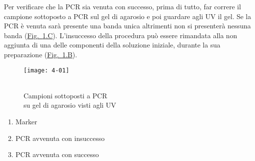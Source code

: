
Per verificare che la PCR sia venuta con successo, prima di tutto, far correre il campione sottoposto a PCR sul gel di agarosio e poi guardare agli UV il gel. Se la PCR è venuta sarà presente una banda unica altrimenti non si presenterà nessuna banda (\hyperref[img:4-01]{Fig.~\ref{img:4-01}.C}). L'insuccesso della procedura può essere rimandata alla non aggiunta di una delle componenti della soluzione iniziale, durante la sua preparazione (\hyperref[img:4-01]{Fig.~\ref{img:4-01}.B}).

\begin{minipage}{0.7\textwidth}
	\begin{figure}[H]
		\captionsetup{singlelinecheck=off}
		\centering
		\begin{annotatedFigure}
			{
				\texttt{[image: 4-01]}
			}
		\end{annotatedFigure}
		\caption{\\Campioni sottoposti a PCR\\ su gel di agarosio visti agli UV}\label{img:4-01}
	\end{figure}
\end{minipage}
\begin{minipage}[b]{0.25\textwidth}
	\begin{enumerate}[label=\Alph*)]
		\item Marker
		\item PCR avvenuta con insuccesso
		\item PCR avvenuta con successo
	\end{enumerate}
\end{minipage}